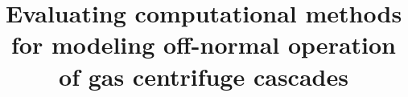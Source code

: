 \documentclass[12pt]{paper}
\begin{document}
\title{Evaluating computational methods for modeling off-normal operation of gas centrifuge cascades}


\date{}

\maketitle


















%

\begin{small}

\end{small}
\end{document}
